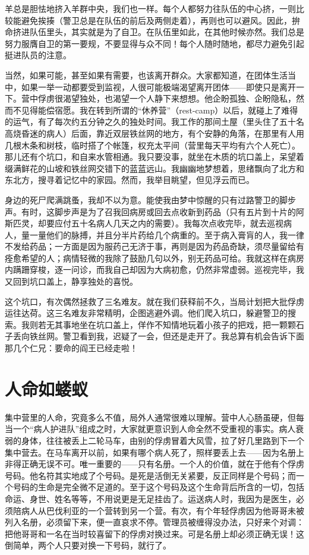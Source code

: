 \documentclass[11pt,oneside]{book}
\begin{document}
\begin{common-format}
羊总是胆怯地挤入羊群中央，我们也一样。每个人都努力往队伍的中心挤，一则比较能避免挨揍（警卫总是在队伍的前后及两侧走着），再则也可以避风。因此，拚命挤进队伍里头，其实就是为了自卫。在队伍里如此，在其他时候亦然。我们总是努力服膺自卫的第一要规，不要显得与众不同！每个人随时随地，都尽力避免引起挺进队员的注意。

当然，如果可能，甚至如果有需要，也该离开群众。大家都知道，在团体生活当中，如果一举一动都要受到监视，人很可能极端渴望离开团体——即使只是离开一下。营中俘虏很渴望独处，也渴望一个人静下来想想。他企盼孤独、企盼隐私，然而不见得能偿宿愿。我在转到所谓的“休养营”（rest-camp）以后，就碰上了难得的运气，有了每次约五分钟之久的独处时间。我工作的那间土屋（里头住了五十名高烧昏迷的病人）后面，靠近双层铁丝网的地方，有个安静的角落，在那里有人用几根木条和树枝，临时搭了个帐篷，权充太平间（营里每天平均有六个人死亡）。那儿还有个坑口，和自来水管相通。我只要没事，就坐在木质的坑口盖上，呆望着缀满鲜花的山坡和铁丝网交错下的蓝蓝远山。我幽幽地梦想着，思绪飘向了北方和东北方，搜寻着记忆中的家园。然而，我举目眺望，但见浮云而已。

身边的死尸爬满跳蚤，我却不以为意。能使我由梦中惊醒的只有过路警卫的脚步声。有时，这脚步声是为了召我回病房或回去点收新到药品（只有五片到十片的阿斯匹灵，却要应付五十名病人几天之内的需要）。我每次点收完毕，就去巡视病人，量一量他们的脉搏，并且分半片药给几个病重的。至于病入膏肓的人，我一律不发给药品；一方面是因为服药己无济于事，再则是因为药品奇缺，须尽量留给有痊愈希望的人；病情轻微的我除了鼓励几句以外，别无药品可给。我就这样在病房内蹒跚穿梭，逐一问诊，而我自己却因为大病初愈，仍然非常虚弱。巡视完毕，我又回到坑口盖上，静享独处的喜悦。

这个坑口，有次偶然拯救了三名难友。就在我们获释前不久，当局计划把大批俘虏运往达荷。这三名难友非常精明，企图逃避外调。他们爬入坑口，躲避警卫的搜索。我则若无其事地坐在坑口盖上，佯作不知情地玩着小孩子的把戏，把一颗颗石子丢向铁丝网。警卫看到我，迟疑了一会，但还是走开了。我总算有机会告诉下面那几个仁兄：要命的阎王已经走啦！


\section{人命如蝼蚁}
集中营里的人命，究竟多么不值，局外人通常很难以理解。营中人心肠虽硬，但每当一个“病人护进队”组成之时，大家就更意识到人命全然不受重视的事实。病人衰弱的身体，往往被丢上二轮马车，由别的俘虏冒着大风雪，拉了好几里路到下一个集中营去。在马车离开以前，如果有哪个病人死了，照样要丢上去——因为名册上非得正确无误不可。唯一重要的——只有名册。一个人的价值，就在于他有个俘虏号码。他名符其实地成了个号码。是死是活倒无关紧要，反正同样是个号码；而一个号码的生命是完全微不足道的。至于这个号码及这个生命背后所含的一切，包括命运、身世、姓名等等，不用说更是无足挂齿了。运送病人时，我因为是医生，必须陪病人从巴伐利亚的一个营转到另一个营。有次，有个年轻俘虏因为他哥哥未被列入名册，必须留下来，便一直哀求不停。管理员被缠得没办法，只好来个对调：把他哥哥和一名在当时较喜留下的俘虏对换过来。可是名册上却必须正确无误！这倒简单，两个人只要对换一下号码，就行了。


\end{common-format}
\end{document}
